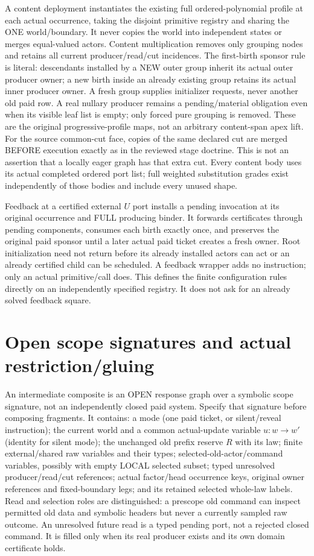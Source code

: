 \documentclass[11pt]{article}\usepackage{amsmath,amssymb,amsthm}
\begin{document}
A content deployment instantiates the existing full ordered-polynomial profile at each actual occurrence, taking the disjoint primitive registry and sharing the ONE world/boundary. It never copies the world into independent states or merges equal-valued actors. Content multiplication removes only grouping nodes and retains all current producer/read/cut incidences. The first-birth sponsor rule is literal: descendants installed by a NEW outer group inherit its actual outer producer owner; a new birth inside an already existing group retains its actual inner producer owner. A fresh group supplies initializer requests, never another old paid row. A real nullary producer remains a pending/material obligation even when its visible leaf list is empty; only forced pure grouping is removed. These are the original progressive-profile maps, not an arbitrary content-span apex lift. For the source common-cut face, copies of the same declared cut are merged BEFORE execution exactly as in the reviewed stage doctrine. This is not an assertion that a locally eager graph has that extra cut. Every content body uses its actual completed ordered port list; full weighted substitution grades exist independently of those bodies and include every unused shape.

Feedback at a certified external $U$ port installs a pending invocation at its original occurrence and FULL producing binder. It forwards certificates through pending components, consumes each birth exactly once, and preserves the original paid sponsor until a later actual paid ticket creates a fresh owner. Root initialization need not return before its already installed actors can act or an already certified child can be scheduled. A feedback wrapper adds no instruction; only an actual primitive/call does. This defines the finite configuration rules directly on an independently specified registry. It does not ask for an already solved feedback square.

\section{Open scope signatures and actual restriction/gluing}
An intermediate composite is an OPEN response graph over a symbolic scope signature, not an independently closed paid system. Specify that signature before composing fragments. It contains: a mode (one paid ticket, or silent/reveal instruction); the current world and a common actual-update variable $u:w\to w'$ (identity for silent mode); the unchanged old prefix reserve $R$ with its law; finite external/shared raw variables and their types; selected-old-actor/command variables, possibly with empty LOCAL selected subset; typed unresolved producer/read/cut references; actual factor/head occurrence keys, original owner references and fixed-boundary legs; and its retained selected whole-law labels. Read and selection roles are distinguished: a prescope old command can inspect permitted old data and symbolic headers but never a currently sampled raw outcome. An unresolved future read is a typed pending port, not a rejected closed command. It is filled only when its real producer exists and its own domain certificate holds.
\end{document}
